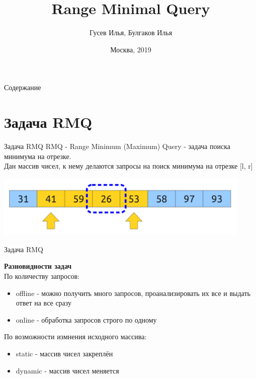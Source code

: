 \documentclass[10pt]{beamer}
\title[\href{https://goo.gl/NRgp8K}{https://goo.gl/NRgp8K} (Term 2)]{Range Minimal Query}
\author[Гусев Илья, Булгаков Илья]{Гусев Илья, Булгаков Илья}
\institute[МФТИ] 
{Московский физико-технический институт\\*}
\date{Москва, 2019}
\begin{document}
\begin{frame}
  \titlepage
\end{frame}

\begin{frame}{Содержание}
\tableofcontents
\end{frame}

\section{Задача RMQ}

\begin{frame}[fragile]{Задача RMQ}
RMQ - Range Minimum (Maximum) Query - задача поиска минимума на отрезке.\\
Дан массив чисел, к нему делаются запросы на поиск минимума на отрезке [l, r]\\

\begin{center}
    \includegraphics[height=3cm]{Term_2/Source/images/9-rmq.png}
\end{center}

\end{frame}

\begin{frame}[fragile]{Задача RMQ}

\textbf{Разновидности задач}\\
По количеству запросов:
\begin{itemize}
    \item offline - можно получить много запросов, проанализировать их все и выдать ответ на все сразу
    \item online - обработка запросов строго по одному
\end{itemize}
По возможности измнения исходного массива:
\begin{itemize}
    \item static - массив чисел закреплён
    \item dynamic - массив чисел меняется
\end{itemize}
\end{frame}
\end{document}
